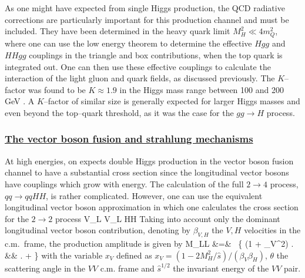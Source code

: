 As one might have expected from single Higgs production, the QCD radiative
corrections are particularly important for this production channel and must  be
included.  They have been determined in the heavy quark limit $M_H^2 \ll 4
m_Q^2$, where one can use the low energy theorem to determine the effective
$Hgg$ and $HHgg$ couplings in the triangle and box contributions, when the top
quark is integrated out. One can then use these effective couplings to calculate
the interaction of the light gluon and quark fields, as discussed previously. 
The $K$--factor was found to be $K\approx 1.9$ in the Higgs mass range between
100 and 200 GeV \cite{pp-ggHH-NLO}. A $K$--factor of  similar size is generally
expected for larger Higgs masses and even beyond the top--quark threshold, as
it was the case for the $gg \to H$ process.

\subsubsection*{\underline{The vector boson fusion and strahlung mechanisms}}

At high energies, on expects double Higgs production in the vector
boson fusion channel to have a substantial cross section since the longitudinal
vector bosons have couplings which grow with energy.  The calculation of the
full $2 \to 4$ process, $qq \to qq HH$, is rather complicated. However, one can
use the equivalent longitudinal vector boson approximation in which one 
calculates the cross section for  the $2 \to 2$ process 
\beq
V_L V_L \to HH
\eeq
Taking into account only the dominant longitudinal vector boson contribution,  
denoting by $\beta_{V,H}$ the $V,H$ velocities in the c.m.\ frame, the
production amplitude is given by
\beq
{\cal M}_{LL} &=&  
\, \left\{ (1 \!+ \beta_V^2)  \right.  \\ 
&&  \left. +    \right\}
\label{WW--HHamp}
\eeq
with the variable $x_V$ defined as $x_V = (1- 2 M_H^2/\hat{s})/(\beta_V
\beta_H)$, $\theta$ the scattering angle in the $VV$ c.m. frame and 
$\hat{s}^{1/2}$ the invariant energy of the $VV$ pair. \s

